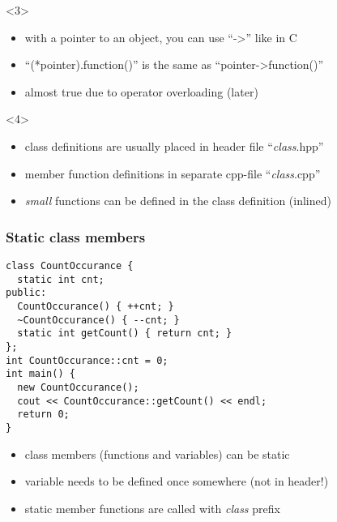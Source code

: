 \documentclass{slides}
\begin{document}
\begin{frame}[fragile]
  \begin{onlyenv}<3>
    \begin{itemize}
    \item with a pointer to an object, you can use ``->'' like in C
    \item ``(*pointer).function()'' is the same as ``pointer->function()''
    \item almost true due to operator overloading (later)
    \end{itemize}
  \end{onlyenv}

  \begin{onlyenv}<4>
    \begin{itemize}
    \item class definitions are usually placed in header file ``\textit{class}.hpp''
    \item member function definitions in separate cpp-file ``\textit{class}.cpp''
    \item \emph{small} functions can be defined in the class definition (\alert{inlined})
    \end{itemize}
  \end{onlyenv}

\end{frame}


\begin{frame}[fragile]
  \frametitle{Static class members}

\begin{lstlisting}[emph={static,getCount}]
class CountOccurance {
  static int cnt;
public:
  CountOccurance() { ++cnt; }
  ~CountOccurance() { --cnt; }
  static int getCount() { return cnt; }
};
int CountOccurance::cnt = 0;
int main() {
  new CountOccurance();
  cout << CountOccurance::getCount() << endl;
  return 0;
}
\end{lstlisting}

  \begin{itemize}
  \item class members (functions and variables) can be static
  \item variable needs to be defined once somewhere (not in header!)
  \item static member functions are called with \emph{class} prefix
  \end{itemize}

\end{frame}
\end{document}
